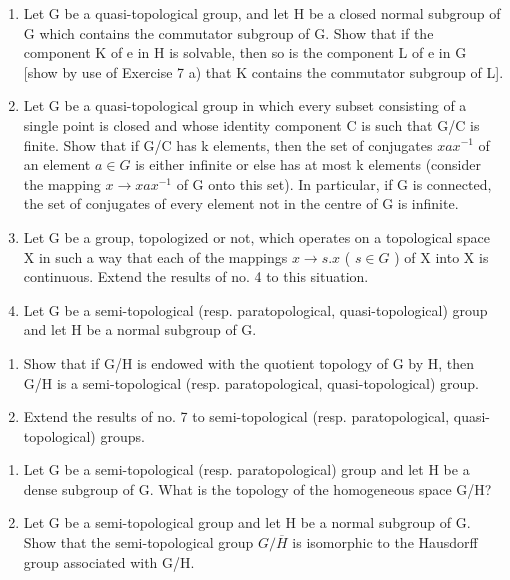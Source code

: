 \begin{enumerate}
\def\labelenumi{\arabic{enumi})}
\setcounter{enumi}{8}
\item
  Let G be a quasi-topological group, and let H be a closed normal subgroup of G which contains the commutator subgroup of G. Show that if the component K of e in H is solvable, then so is the component L of e in G {[}show by use of Exercise 7 a) that K contains the commutator subgroup of L{]}.
\item
  Let G be a quasi-topological group in which every subset consisting of a single point is closed and whose identity component C is such that G/C is finite. Show that if G/C has k elements, then the set of conjugates \(xax^{-1}\) of an element \(a \in G\) is either infinite or else has at most k elements (consider the mapping \(x \rightarrow xax^{-1}\) of G onto this set). In particular, if G is connected, the set of conjugates of every element not in the centre of G is infinite.
\item
  Let G be a group, topologized or not, which operates on a topological space X in such a way that each of the mappings \(x \rightarrow s.x\) ( \(s \in G\) ) of X into X is continuous. Extend the results of no. 4 to this situation.
\item
  Let G be a semi-topological (resp. paratopological, quasi-topological) group and let H be a normal subgroup of G.
\end{enumerate}

\begin{enumerate}
\def\labelenumi{\alph{enumi})}
\item
  Show that if G/H is endowed with the quotient topology of G by H, then G/H is a semi-topological (resp. paratopological, quasi-topological) group.
\item
  Extend the results of no. 7 to semi-topological (resp. paratopological, quasi-topological) groups.
\end{enumerate}

\begin{enumerate}
\def\labelenumi{\arabic{enumi})}
\setcounter{enumi}{12}
\item
  Let G be a semi-topological (resp. paratopological) group and let H be a dense subgroup of G. What is the topology of the homogeneous space G/H?
\item
  Let G be a semi-topological group and let H be a normal subgroup of G. Show that the semi-topological group \(G/\overline{H}\) is isomorphic to the Hausdorff group associated with G/H.
\end{enumerate}

